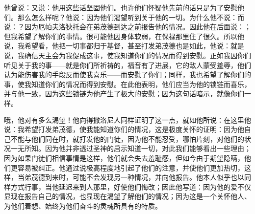 \par

\par

他曾说：又说：他用这些话坚固他们。也许他们怀疑他先前的话只是为了安慰他们。那么怎么样呢？他说：因为他们渴望听到关于他的一切。为什么他不说：而说：？因为厄帕夫洛狄托会在弟茂德到达之前报告他的情况。因此他在后面说：；但我希望了解你们的事情。很可能他因身体软弱，在保禄那里住了很久。所以他说，我希望看，他把一切事都归于基督，甚至打发弟茂德也是如此，他说：就是说，我确信天主会为我促成这事，使我知道你们的情况而得到安慰。正如我因你们听见关于我的事——就是你们所祈祷的，福音有了进展，它的敌人蒙受羞辱，他们认为能伤害我的手段反而使我喜乐——而安慰了你们；同样，我也希望了解你们的事，使我知道你们的情况而得到安慰。在此他表明，他们应当为他的锁链而喜乐，并与他一致，因为这些锁链为他产生了极大的安慰；因为这句话暗示，就像你们一样。\par

哦，他对有多么渴望！他向得撒洛尼人同样证明了这一点，就如他所说：在这里他说：我希望打发弟茂德，使我能知道你们的情况，这是极度关怀的证明：因为他自己不能与他们同在时，就打发他的门徒，因为他不能忍受，哪怕片刻，对他们的状况一无所知。因为他并非透过圣神的启示知道一切，对此我们能够看出一些理由；因为如果门徒们相信事情是这样，他们就会失去羞耻感，但如今由于期望隐瞒，他们更容易被纠正。他通过说极高程度地引起了他们的注意，并使他们更加热切，这样，当弟茂德到来时，可能不会发现另一种情况，并向他报告。他本人似乎也以同样方式行事，当他延迟来到人那里，好使他们悔改；因此他写道：因为他的爱不仅显现在报告自己的情况，也显现在渴望了解他们的情况；因为这是一个关怀他人、为他们着想、始终为他们奋斗的灵魂所具有的特质。\par

